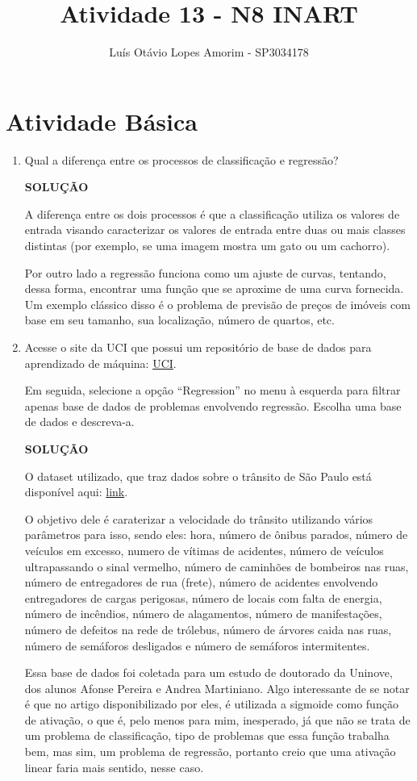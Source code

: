 \documentclass[a4paper, 12pt]{article}
\title{Atividade 13 - N8 INART}
\author{Luís Otávio Lopes Amorim - SP3034178}
\newcommand{\solucao}{
\begin{center}
\textbf{SOLUÇÃO}
\end{center}}
\begin{document}
\maketitle
\section{Atividade Básica}
\begin{enumerate}
\item Qual a diferença entre os processos de classificação e regressão?

\solucao

A diferença entre os dois processos é que a classificação utiliza os valores de entrada visando caracterizar os valores de entrada entre duas ou mais classes distintas (por exemplo, se uma imagem mostra um gato ou um cachorro).

Por outro lado a regressão funciona como um ajuste de curvas, tentando, dessa forma, encontrar uma função que se aproxime de uma curva fornecida. Um exemplo clássico disso é o problema de previsão de preços de imóveis com base em seu tamanho, sua localização, número de quartos, etc.

\item Acesse o site da UCI que possui um repositório de base de dados para aprendizado de máquina: \href{https://archive.ics.uci.edu/ml/datasets.php}{UCI}.

Em seguida, selecione a opção “Regression” no menu à esquerda para filtrar apenas base de dados de problemas envolvendo regressão. Escolha uma base de dados e descreva-a.

\solucao

O dataset utilizado, que traz dados sobre o trânsito de São Paulo está disponível aqui: \href{https://archive.ics.uci.edu/ml/datasets/Behavior+of+the+urban+traffic+of+the+city+of+Sao+Paulo+in+Brazil}{link}.

O objetivo dele é caraterizar a velocidade do trânsito utilizando vários parâmetros para isso, sendo eles: hora, número de ônibus parados, número de veículos em excesso, numero de vítimas de acidentes, número de veículos ultrapassando o sinal vermelho, número de caminhões de bombeiros nas ruas, número de entregadores de rua (frete), número de acidentes envolvendo entregadores de cargas perigosas, número de locais com falta de energia, número de incêndios, número de alagamentos, número de manifestações, número de defeitos na rede de trólebus, número de árvores caida nas ruas, número de semáforos desligados e número de semáforos intermitentes.

Essa base de dados foi coletada para um estudo de doutorado da Uninove, dos alunos Afonse Pereira e Andrea Martiniano. Algo interessante de se notar é que no artigo disponibilizado por eles, é utilizada a sigmoide como função de ativação, o que é, pelo menos para mim, inesperado, já que não se trata de um problema de classificação, tipo de problemas que essa função trabalha bem, mas sim, um problema de regressão, portanto creio que uma ativação linear faria mais sentido, nesse caso.
\end{enumerate}
\end{document}

